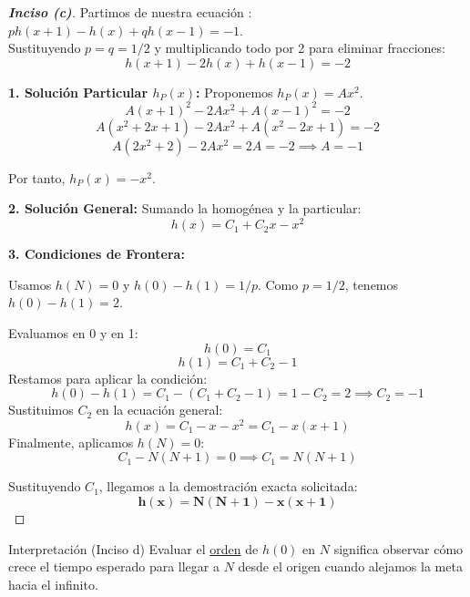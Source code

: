 \documentclass[10pt,a4paper]{article}
\begin{document}
\begin{proof}[\textbf{Inciso (c)}]

    Partimos de nuestra ecuación : $p h(x+1) - h(x) + q h(x-1) = -1$. \\
    Sustituyendo $p = q = 1/2$ y multiplicando todo por 2 para eliminar fracciones:
    \[ h(x+1) - 2h(x) + h(x-1) = -2 \]

    \textbf{1. Solución Particular $h_P(x)$:} Proponemos $h_P(x) = Ax^2$.
    \[ A(x+1)^2 - 2Ax^2 + A(x-1)^2 = -2 \]
    \[ A(x^2 + 2x + 1) - 2Ax^2 + A(x^2 - 2x + 1) = -2 \]
    \[ A(2x^2 + 2) - 2Ax^2 = 2A = -2 \implies A = -1 \]

    \vspace{2mm}

    Por tanto, $h_P(x) = -x^2$.

    \vspace{2mm}

    \textbf{2. Solución General:} Sumando la homogénea y la particular:
    \[ h(x) = C_1 + C_2 x - x^2 \]

    \vspace{2mm}

    \textbf{3. Condiciones de Frontera:} 

    \vspace{2mm}

    Usamos $h(N) = 0$ y $h(0) - h(1) = 1/p$. Como $p=1/2$, tenemos $h(0) - h(1) = 2$.
    
    Evaluamos en 0 y en 1:
    \[ h(0) = C_1 \]
    \[ h(1) = C_1 + C_2 - 1 \]
    Restamos para aplicar la condición:
    \[ h(0) - h(1) = C_1 - (C_1 + C_2 - 1) = 1 - C_2 = 2 \implies C_2 = -1 \]
    Sustituimos $C_2$ en la ecuación general:
    \[ h(x) = C_1 - x - x^2 = C_1 - x(x+1) \]
    Finalmente, aplicamos $h(N) = 0$:
    \[ C_1 - N(N+1) = 0 \implies C_1 = N(N+1) \]
    
    Sustituyendo $C_1$, llegamos a la demostración exacta solicitada:
    \[ \mathbf{h(x) = N(N+1) - x(x+1)} \]
\end{proof}

\vspace{2mm}

\begin{alerta}{Interpretación (Inciso d)}
    Evaluar el \ul{orden} de $h(0)$ en $N$ significa observar cómo crece el tiempo esperado para llegar a $N$ desde el origen cuando alejamos la meta hacia el infinito.
\end{alerta}

\vspace{2mm}
\end{document}

